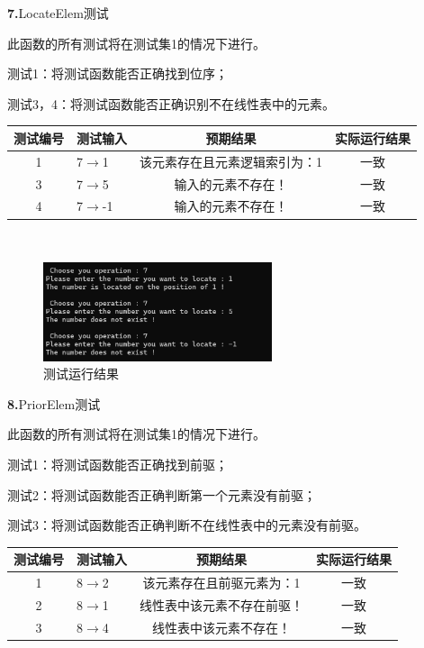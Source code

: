 \documentclass[supercite]{Experimental_Report}
\theoremstyle{definition}
\begin{document}
\noindent\textbf{ 7.}LocateElem测试

此函数的所有测试将在测试集1的情况下进行。

测试1：将测试函数能否正确找到位序；

测试3，4：将测试函数能否正确识别不在线性表中的元素。

\vspace{0.5em}

\begin{tabular}{|c|l|c|c|}
	\hline
	测试编号 & 测试输入 & 预期结果 & 实际运行结果 \\
	\hline
	1 & 7$\rightarrow$1 & 该元素存在且元素逻辑索引为：1 & 一致 \\
	\hline
	3 & 7$\rightarrow$5 & 输入的元素不存在！ & 一致 \\
	\hline
	4 & 7$\rightarrow$-1 & 输入的元素不存在！ & 一致 \\
	\hline
\end{tabular}

~\

 \begin{figure}[H]
 	\centering
 	\includegraphics[width=0.6\textwidth]{images/线性表测试7.png}
 	\caption{测试运行结果}
 	\label{txlab}
 \end{figure}


\noindent\textbf{ 8.}PriorElem测试

    此函数的所有测试将在测试集1的情况下进行。

    测试1：将测试函数能否正确找到前驱；

    测试2：将测试函数能否正确判断第一个元素没有前驱；

    测试3：将测试函数能否正确判断不在线性表中的元素没有前驱。

\vspace{0.5em}

\begin{tabular}{|c|l|c|c|}
	\hline
	测试编号 & 测试输入 & 预期结果 & 实际运行结果 \\
	\hline
	1 & 8$\rightarrow$2 & 该元素存在且前驱元素为：1 & 一致 \\
	\hline
	2 & 8$\rightarrow$1 & 线性表中该元素不存在前驱！ & 一致 \\
	\hline
	3 & 8$\rightarrow$4 & 线性表中该元素不存在！ & 一致 \\
	\hline
\end{tabular}
\end{document}

